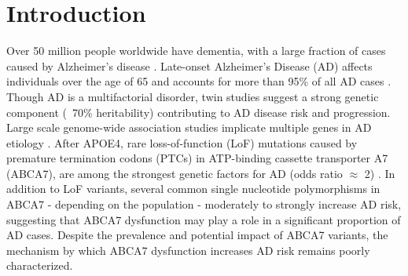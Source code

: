 \documentclass[12pt]{article}
\begin{document}
\linenumbers

\section{Introduction}
\label{sec:introduction}
Over 50 million people worldwide have dementia, with a large fraction of cases caused by Alzheimer’s disease \cite{WHO2023Dementia}. Late-onset Alzheimer’s Disease (AD) affects individuals over the age of 65 and accounts for more than 95\% of all AD cases \cite{Alzheimers_Association2016-jx}. Though AD is a multifactorial disorder, twin studies suggest a strong genetic component (~70\% heritability) \cite{Karlsson2022-vv} contributing to AD disease risk and progression. Large scale genome-wide association studies implicate multiple genes in AD etiology \cite{Lambert2013-km,Marioni2019-os,Jansen2019-ww,Kunkle2019-yo,Wightman2021-km,Bellenguez2022-ao,Belloy2023-kj}. After APOE4, rare loss-of-function (LoF) mutations caused by premature termination codons (PTCs) in ATP-binding cassette transporter A7 (ABCA7), are among the strongest genetic factors for AD (odds ratio $\approx$ 2) \cite{Steinberg2015-mu,De_Roeck2019-bs,Reitz2013-eo,Bellenguez2022-ao,Holstege2022-vp,Lyssenko2021-gw}. In addition to LoF variants, several common single nucleotide polymorphisms in ABCA7 - depending on the population - moderately \cite{Steinberg2015-mu,De_Roeck2019-bs,Reitz2013-eo,Bellenguez2022-ao,Le_Guennec2016-mr,Hollingworth2011-tr,Naj2011-bs} to strongly \cite{Reitz2013-eo} increase AD risk, suggesting that ABCA7 dysfunction may play a role in a significant proportion of AD cases. Despite the prevalence and potential impact of ABCA7 variants, the mechanism by which ABCA7 dysfunction increases AD risk remains poorly characterized. 
\end{document}
